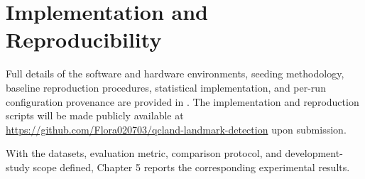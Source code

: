 
\section{Implementation and Reproducibility}
\label{sec:setup-implementation}

Full details of the software and hardware environments, seeding
methodology, baseline reproduction procedures, statistical
implementation, and per-run configuration provenance are provided in
. The implementation and reproduction
scripts will be made publicly available at
\url{https://github.com/Flora020703/qcland-landmark-detection}
upon submission.

With the datasets, evaluation metric, comparison protocol, and
development-study scope defined, Chapter 5 reports the corresponding
experimental results.
